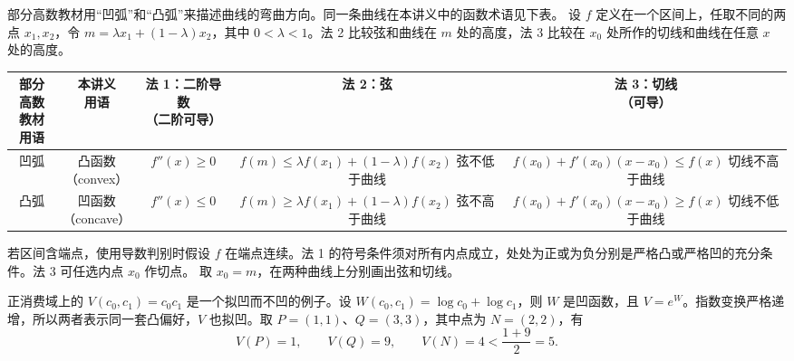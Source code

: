 \begin{tcolorbox}[knowledge,title=凹凸函数的判别]
部分高数教材用“凹弧”和“凸弧”来描述曲线的弯曲方向。同一条曲线在本讲义中的函数术语见下表。
设 $f$ 定义在一个区间上，任取不同的两点 $x_1,x_2$，令 $m=\lambda x_1+(1-\lambda)x_2$，其中 $0<\lambda<1$。法 2 比较弦和曲线在 $m$ 处的高度，法 3 比较在 $x_0$ 处所作的切线和曲线在任意 $x$ 处的高度。

{\small
\setlength{\tabcolsep}{3pt}
\renewcommand{\arraystretch}{1.2}
\noindent\begin{tabular*}{\linewidth}{@{\extracolsep{\fill}}ccccc@{}}
\toprule
\makecell{部分高数\\教材用语} &
\makecell{本讲义\\用语} &
\makecell{法 1：二阶导数\\（二阶可导）} &
法 2：弦 &
\makecell{法 3：切线\\（可导）} \\
\midrule
凹弧 & \makecell{凸函数\\（convex）} &
$f''(x)\ge 0$ &
\makecell{$f(m)\le\lambda f(x_1)+(1-\lambda)f(x_2)$\\弦不低于曲线} &
\makecell{$f(x_0)+f'(x_0)(x-x_0)\le f(x)$\\切线不高于曲线} \\
\addlinespace[2pt]
凸弧 & \makecell{凹函数\\（concave）} &
$f''(x)\le 0$ &
\makecell{$f(m)\ge\lambda f(x_1)+(1-\lambda)f(x_2)$\\弦不高于曲线} &
\makecell{$f(x_0)+f'(x_0)(x-x_0)\ge f(x)$\\切线不低于曲线} \\
\bottomrule
\end{tabular*}\par}

若区间含端点，使用导数判别时假设 $f$ 在端点连续。法 1 的符号条件须对所有内点成立，处处为正或为负分别是严格凸或严格凹的充分条件。法 3 可任选内点 $x_0$ 作切点。 取 $x_0=m$，在两种曲线上分别画出弦和切线。

\end{tcolorbox}

正消费域上的 $V(c_0,c_1)=c_0c_1$ 是一个拟凹而不凹的例子。设 $W(c_0,c_1)=\log c_0+\log c_1$，则 $W$ 是凹函数，且 $V=e^W$。指数变换严格递增，所以两者表示同一套凸偏好，$V$ 也拟凹。取 $P=(1,1)$、$Q=(3,3)$，其中点为 $N=(2,2)$，有
\[
 V(P)=1,\qquad V(Q)=9,\qquad V(N)=4<\frac{1+9}{2}=5.
\]

